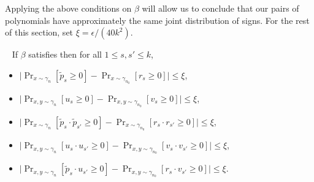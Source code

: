 \documentclass{toc}
\begin{document}
Applying the above conditions on $\beta$ will allow us to conclude that our pairs
of polynomials have approximately the same joint distribution of signs. For
the rest of this section, set $\xi = {\epsilon}/{(40k^2)}$.
\begin{corollary}~\label{corr:bounds}
    If $\beta$ satisfies  then
for all $1 \le s, s' \le k$, 
\begin{itemize}
\item[(a)] $\big| \Pr_{x \sim \gamma_{n}}[ \tilde{p}_s \ge 0 ] - \Pr_{x \sim \gamma_{n_0}}[ r_s \ge 0]\big| \le \xi$,
\item[(b)] $\big| \Pr_{x,y \sim \gamma_{n}}[ u_s \ge 0 ] -\Pr_{x,y \sim \gamma_{n_0}}[ v_s \ge 0]\big| \le \xi$,
\item[(c)] $\big| \Pr_{x \sim \gamma_{n}}[ \tilde{p}_s \cdot \tilde{p}_{s'} \ge 0 ] - \Pr_{x \sim \gamma_{n_0}}[ {r}_s \cdot {r}_{s'} \ge 0]\big| \le \xi$,
\item[(d)] $\big| \Pr_{x,y \sim \gamma_{n}}[ {u}_s \cdot {u}_{s'} \ge 0 ] - \Pr_{x,y \sim \gamma_{n_0}}[ {v}_s \cdot {v}_{s'} \ge 0]\big| \le \xi$,
\item[(e)] $\big| \Pr_{x,y \sim \gamma_{n}}[ \tilde{p}_s \cdot {u}_{s'} \ge 0 ] - \Pr_{x,y \sim \gamma_{n_0}}[ {r}_s \cdot {v}_{s'} \ge 0]\big| \le \xi$.
\end{itemize}
\end{corollary}
\end{document}
